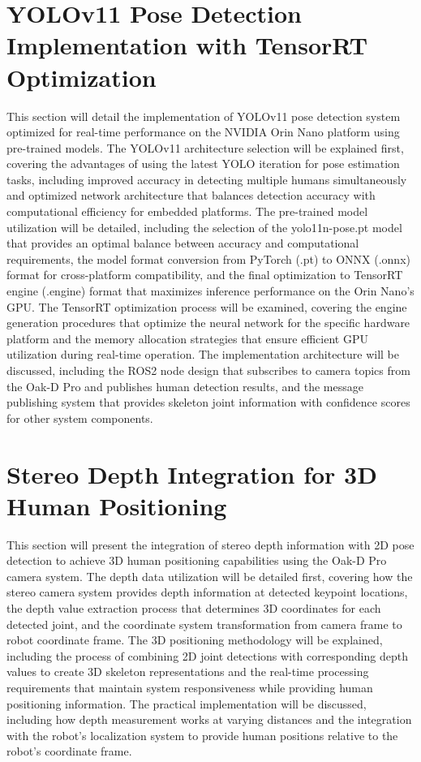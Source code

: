 \section{YOLOv11 Pose Detection Implementation with TensorRT Optimization}
This section will detail the implementation of YOLOv11 pose detection system optimized for real-time performance on the NVIDIA Orin Nano platform using pre-trained models. The YOLOv11 architecture selection will be explained first, covering the advantages of using the latest YOLO iteration for pose estimation tasks, including improved accuracy in detecting multiple humans simultaneously and optimized network architecture that balances detection accuracy with computational efficiency for embedded platforms. The pre-trained model utilization will be detailed, including the selection of the yolo11n-pose.pt model that provides an optimal balance between accuracy and computational requirements, the model format conversion from PyTorch (.pt) to ONNX (.onnx) format for cross-platform compatibility, and the final optimization to TensorRT engine (.engine) format that maximizes inference performance on the Orin Nano's GPU. The TensorRT optimization process will be examined, covering the engine generation procedures that optimize the neural network for the specific hardware platform and the memory allocation strategies that ensure efficient GPU utilization during real-time operation. The implementation architecture will be discussed, including the ROS2 node design that subscribes to camera topics from the Oak-D Pro and publishes human detection results, and the message publishing system that provides skeleton joint information with confidence scores for other system components.

\section{Stereo Depth Integration for 3D Human Positioning}
This section will present the integration of stereo depth information with 2D pose detection to achieve 3D human positioning capabilities using the Oak-D Pro camera system. The depth data utilization will be detailed first, covering how the stereo camera system provides depth information at detected keypoint locations, the depth value extraction process that determines 3D coordinates for each detected joint, and the coordinate system transformation from camera frame to robot coordinate frame. The 3D positioning methodology will be explained, including the process of combining 2D joint detections with corresponding depth values to create 3D skeleton representations and the real-time processing requirements that maintain system responsiveness while providing human positioning information. The practical implementation will be discussed, including how depth measurement works at varying distances and the integration with the robot's localization system to provide human positions relative to the robot's coordinate frame.


